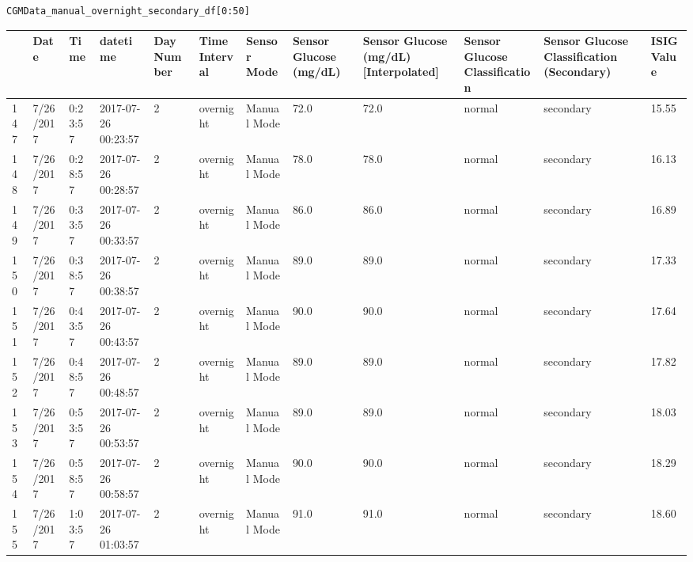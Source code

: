 \bigskip

\begin{verbatim}
CGMData_manual_overnight_secondary_df[0:50]
\end{verbatim}

\bigskip\noindent
\begin{tabular}{p{}p{}p{}p{}p{}p{}p{}p{}p{}p{}p{}p{}}
\toprule
 & Date & Time & datetime & Day Number & Time Interval & Sensor Mode & Sensor Glucose (mg/dL) & Sensor Glucose (mg/dL) [Interpolated] & Sensor Glucose Classification & Sensor Glucose Classification (Secondary) & ISIG Value \\
\hline
147 & 7/26/2017 & 0:23:57 & 2017-07-26 00:23:57 & 2 & overnight & Manual Mode & 72.0 & 72.0 & normal & secondary & 15.55 \\
\hline
148 & 7/26/2017 & 0:28:57 & 2017-07-26 00:28:57 & 2 & overnight & Manual Mode & 78.0 & 78.0 & normal & secondary & 16.13 \\
\hline
149 & 7/26/2017 & 0:33:57 & 2017-07-26 00:33:57 & 2 & overnight & Manual Mode & 86.0 & 86.0 & normal & secondary & 16.89 \\
\hline
150 & 7/26/2017 & 0:38:57 & 2017-07-26 00:38:57 & 2 & overnight & Manual Mode & 89.0 & 89.0 & normal & secondary & 17.33 \\
\hline
151 & 7/26/2017 & 0:43:57 & 2017-07-26 00:43:57 & 2 & overnight & Manual Mode & 90.0 & 90.0 & normal & secondary & 17.64 \\
\hline
152 & 7/26/2017 & 0:48:57 & 2017-07-26 00:48:57 & 2 & overnight & Manual Mode & 89.0 & 89.0 & normal & secondary & 17.82 \\
\hline
153 & 7/26/2017 & 0:53:57 & 2017-07-26 00:53:57 & 2 & overnight & Manual Mode & 89.0 & 89.0 & normal & secondary & 18.03 \\
\hline
154 & 7/26/2017 & 0:58:57 & 2017-07-26 00:58:57 & 2 & overnight & Manual Mode & 90.0 & 90.0 & normal & secondary & 18.29 \\
\hline
155 & 7/26/2017 & 1:03:57 & 2017-07-26 01:03:57 & 2 & overnight & Manual Mode & 91.0 & 91.0 & normal & secondary & 18.60 \\

\end{tabular}
